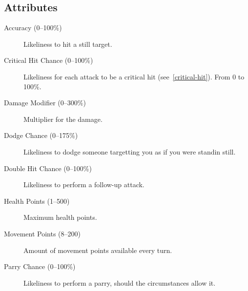 \subsection{Attributes}
\label{character-attributes}
\begin{description}
\item[Accuracy (0--100\%)] Likeliness to hit a still target.
\item[Critical Hit Chance (0--100\%)]
   Likeliness for each attack to be a critical hit (see~\ref{critical-hit}).
   From 0 to 100\%.
\item[Damage Modifier (0--300\%)] Multiplier for the damage.
\item[Dodge Chance (0--175\%)] Likeliness to dodge someone targetting you as if
you were standin still.
\item[Double Hit Chance (0--100\%)] Likeliness to perform a follow-up attack.
\item[Health Points (1--500)] Maximum health points.
\item[Movement Points (8--200)] Amount of movement points available every turn.
\item[Parry Chance (0--100\%)]
   Likeliness to perform a parry, should the circumstances allow it.
\end{description}
